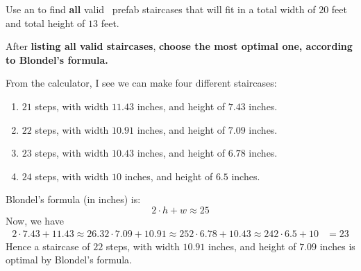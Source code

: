 \documentclass[noauthor,nooutcomes,handout]{ximera}
\begin{document}
\begin{question}
  Use an  to
  find \textbf{all} valid \mooculus~prefab staircases that will fit in
  a total width of $20$ feet and total height of $13$ feet.

 After \textbf{listing all valid staircases}, \textbf{choose the most optimal one,
 according to Blondel's formula.}

  \begin{freeResponse}
    From the calculator, I see we can make four different staircases:
    \begin{enumerate}
    \item $21$ steps, with width $11.43$ inches, and height of $7.43$ inches.
    \item $22$ steps, with width $10.91$ inches, and height of $7.09$ inches.
    \item $23$ steps, with width $10.43$ inches, and height of $6.78$ inches.
    \item $24$ steps, with width $10$ inches, and height of $6.5$ inches.
    \end{enumerate}
    Blondel's formula (in inches) is:
    \[
    2\cdot h + w \approx 25
    \]
    Now, we have
    \begin{align*}
      2\cdot 7.43 + 11.43 \approx 26.3
      2\cdot 7.09 + 10.91 \approx 25
      2\cdot 6.78 + 10.43 \approx 24
      2\cdot 6.5 + 10 &= 23
    \end{align*}
    Hence a staircase of $22$ steps, with width $10.91$ inches, and
    height of $7.09$ inches is optimal by Blondel's formula.
  \end{freeResponse}
\end{question}
\mynewpage
\end{document}

